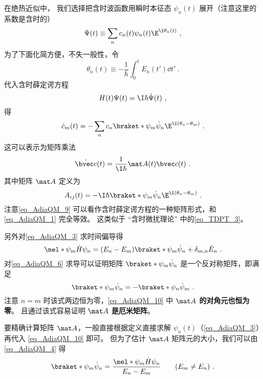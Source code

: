 在绝热近似中， 我们选择把含时波函数用瞬时本征态 $\psi_n(t)$ 展开（注意这里的系数是含时的）
\begin{equation}
\Psi(t) \equiv \sum_n c_n(t) \psi_n(t) \E^{\I \theta_n(t)}~,
\end{equation}
为了下面化简方便，不失一般性，令
\begin{equation}
\theta_n(t) \equiv -\frac{1}{\hbar} \int_0^t E_n(t')\dd{t'}~.
\end{equation}
代入含时薛定谔方程
\begin{equation}\label{eq_AdiaQM_1}
H(t)\Psi(t) = \I\hbar \dot \Psi(t)~,
\end{equation}
得
\begin{equation}\label{eq_AdiaQM_5}
\dot c_m(t) = -\sum_n c_n \braket*{\psi_m}{\dot\psi_n}\E^{\I(\theta_n-\theta_m)}~.
\end{equation}
这可以表示为矩阵乘法
\begin{equation}\label{eq_AdiaQM_9}
\dot{\bvec c}(t) = \frac{1}{\I\hbar}\mat A(t) \bvec c(t)~.
\end{equation}
其中矩阵 $\mat A$ 定义为
\begin{equation}\label{eq_AdiaQM_10}
A_{ij}(t) = -\I\hbar \braket*{\psi_m}{\dot\psi_n}\E^{\I(\theta_n-\theta_m)}~.
\end{equation}
注意\autoref{eq_AdiaQM_9} 可以看作含时薛定谔方程的一种矩阵形式，和\autoref{eq_AdiaQM_1} 完全等效。 这类似于 “含时微扰理论” 中的\autoref{eq_TDPT_3}。

另外对\autoref{eq_AdiaQM_3} 求时间偏导得
\begin{equation}\label{eq_AdiaQM_4}
\mel*{\psi_m}{\dot H}{\psi_n} = (E_n-E_m)\braket*{\psi_m}{\dot\psi_n} + \delta_{m,n}\dot E_n~.
\end{equation}
对\autoref{eq_AdiaQM_6} 求导可以证明矩阵 $\braket*{\psi_m}{\dot\psi_n}$ 是一个反对称矩阵，即满足
\begin{equation}\label{eq_AdiaQM_7}
\braket*{\psi_m}{\dot\psi_n} = -\braket*{\psi_n}{\dot\psi_m}~.
\end{equation}
注意 $n=m$ 时该式两边恒为零，\autoref{eq_AdiaQM_10} 中 \textbf{$\mat A$ 的对角元也恒为零}。 且通过该式容易证明 \textbf{$\mat A$ 是厄米矩阵}。

要精确计算矩阵 $\mat A$，一般直接根据定义直接求解 $\psi_n(t)$（\autoref{eq_AdiaQM_3}）再代入 \autoref{eq_AdiaQM_10} 即可。 但为了估计 $\mat A$ 矩阵元的大小，我们可以由\autoref{eq_AdiaQM_4} 得
\begin{equation}\label{eq_AdiaQM_11}
\braket*{\psi_m}{\dot\psi_n} = \frac{\mel*{\psi_m}{\dot H}{\psi_n}}{E_n-E_m} \qquad (E_m\ne E_n)~.
\end{equation}

